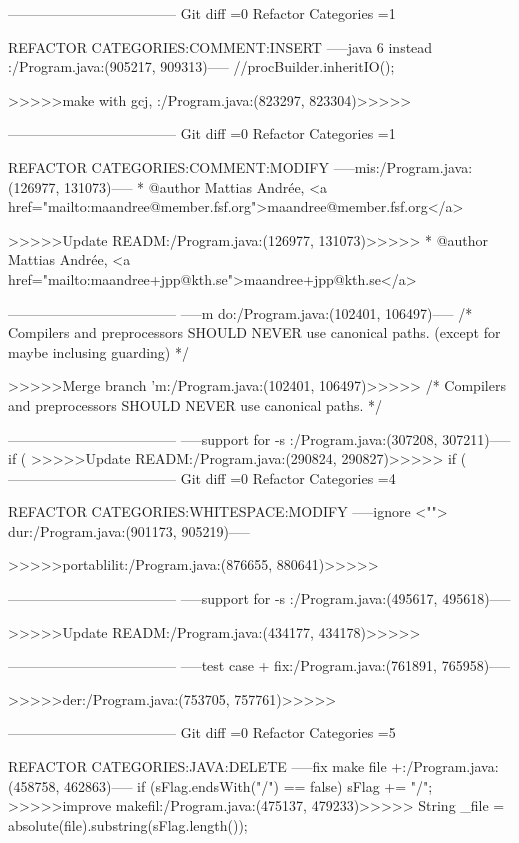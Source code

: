 {{{{{{{{{{------------------------------------
Git diff =0  Refactor Categories =1

REFACTOR CATEGORIES:COMMENT:INSERT
-----java 6 instead :/Program.java:(905217, 909313)-----
        //procBuilder.inheritIO();
 
>>>>>make with gcj, :/Program.java:(823297, 823304)>>>>>
        
------------------------------------
Git diff =0  Refactor Categories =1

REFACTOR CATEGORIES:COMMENT:MODIFY
-----mis:/Program.java:(126977, 131073)-----
 * @author  Mattias Andrée, <a href="mailto:maandree@member.fsf.org">maandree@member.fsf.org</a>
 
>>>>>Update READM:/Program.java:(126977, 131073)>>>>>
 * @author  Mattias Andrée, <a href="mailto:maandree+jpp@kth.se">maandree+jpp@kth.se</a>
 
------------------------------------
-----m do:/Program.java:(102401, 106497)-----
/* Compilers and preprocessors SHOULD NEVER use canonical paths. (except for maybe inclusing guarding) */


>>>>>Merge branch 'm:/Program.java:(102401, 106497)>>>>>
/* Compilers and preprocessors SHOULD NEVER use canonical paths. */


------------------------------------
-----support for -s :/Program.java:(307208, 307211)-----
if (
>>>>>Update READM:/Program.java:(290824, 290827)>>>>>
if (
------------------------------------
Git diff =0  Refactor Categories =4

REFACTOR CATEGORIES:WHITESPACE:MODIFY
-----ignore <""> dur:/Program.java:(901173, 905219)-----

			
>>>>>portablilit:/Program.java:(876655, 880641)>>>>>

	
------------------------------------
-----support for -s :/Program.java:(495617, 495618)-----
		
>>>>>Update READM:/Program.java:(434177, 434178)>>>>>
		
------------------------------------
-----test case + fix:/Program.java:(761891, 765958)-----

		    
>>>>>der:/Program.java:(753705, 757761)>>>>>

	
------------------------------------
Git diff =0  Refactor Categories =5

REFACTOR CATEGORIES:JAVA:DELETE
-----fix make file +:/Program.java:(458758, 462863)-----
if (sFlag.endsWith("/") == false)
		sFlag += "/";
>>>>>improve makefil:/Program.java:(475137, 479233)>>>>>
		String _file = absolute(file).substring(sFlag.length());
	
}}}}}}}}}}
